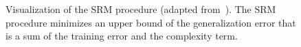 \documentclass[11pt,a4paper]{article}
\numberwithin{equation}{section}
\begin{document}
\begin{figure}
\centering
{}
\caption{Visualization of the SRM procedure (adapted from~\citet{ml_mohri}). The
SRM procedure minimizes an upper bound of the generalization error that is a sum
of the training error and the complexity term.\label{fig:srm_graph}}
\end{figure}
\end{document}
